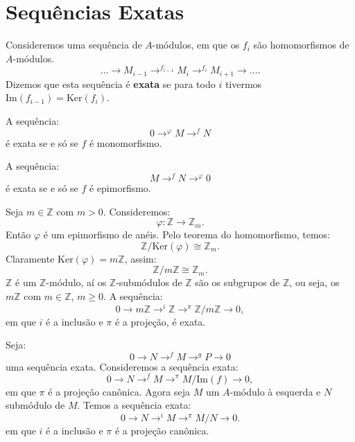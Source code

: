 \documentclass[11pt,twoside,a4paper]{book}
\begin{document}
\section{Sequências Exatas}

\begin{definicao}
Consideremos uma sequência de $A$-módulos, em que os $f_i$ são homomorfismos de $A$-módulos.
\[
\dots\rightarrow M_{i-1}\rightarrow^{f_{i-1}} M_i\rightarrow^{f_i} M_{i+1}\rightarrow\dots.
\]
Dizemos que esta sequência é \textbf{exata} se para todo $i$ tivermos $\mathrm{Im}(f_{i-1})=\mathrm{Ker}(f_i)$.
\end{definicao}

\begin{exemplo}
A sequência:
\[
0\rightarrow^\varphi M\rightarrow^f N
\]
é exata se e só se $f$ é monomorfismo.
\end{exemplo}

\begin{exemplo}
A sequência:
\[
M\rightarrow^f N\rightarrow^\varphi 0
\]
é exata se e só se $f$ é epimorfismo.
\end{exemplo}

\begin{exemplo}
Seja $m\in\mathbb{Z}$ com $m>0$. Consideremos:
\[
\varphi:\mathbb{Z}\rightarrow\mathbb{Z}_m.
\]
Então $\varphi$ é um epimorfismo de anéis. Pelo teorema do homomorfismo, temos:
\[
\mathbb{Z}/\mathrm{Ker}(\varphi)\cong\mathbb{Z}_m.
\]
Claramente $\mathrm{Ker}(\varphi)=m\mathbb{Z}$, assim:
\[
\mathbb{Z}/m\mathbb{Z}\cong\mathbb{Z}_m.
\]
$\mathbb{Z}$ é um $\mathbb{Z}$-módulo, aí os $\mathbb{Z}$-submódulos de $\mathbb{Z}$ são os subgrupos de $\mathbb{Z}$, ou seja, os $m\mathbb{Z}$ com $m\in\mathbb{Z}$, $m\geq 0$. A sequência:
\[
0\rightarrow m\mathbb{Z}\rightarrow^i\mathbb{Z}\rightarrow^\pi\mathbb{Z}/m\mathbb{Z}\rightarrow 0,
\]
em que $i$ é a inclusão e $\pi$ é a projeção, é exata.
\end{exemplo}

\begin{exemplo}
Seja:
\[
0\rightarrow N\rightarrow^f M\rightarrow^g P\rightarrow 0
\]
uma sequência exata. Consideremos a sequência exata:
\[
0\rightarrow N\rightarrow^f M\rightarrow^\pi M/\mathrm{Im}(f)\rightarrow 0,
\]
em que $\pi$ é a projeção canônica. Agora seja $M$ um $A$-módulo à esquerda e $N$ submódulo de $M$. Temos a sequência exata:
\[
0\rightarrow N\rightarrow^i M\rightarrow^\pi M/N\rightarrow 0.
\]
em que $i$ é a inclusão e $\pi$ é a projeção canônica.
\end{exemplo}

\printindex
\end{document}
